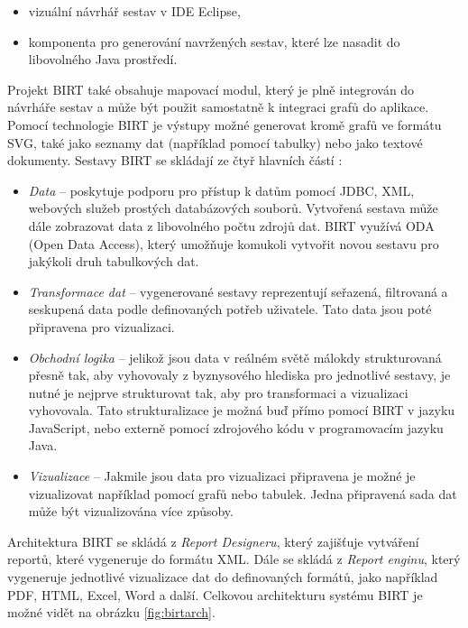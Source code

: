 \documentclass[czech,master,public,dept460,male,cpdeclaration,oneside]{diploma}
\begin{document}
\begin{itemize}
\item vizuální návrhář sestav v IDE Eclipse,
\item komponenta pro generování navržených sestav, které lze nasadit do libovolného Java prostředí.
\end{itemize}

Projekt BIRT také obsahuje mapovací modul, který je plně integrován do návrháře sestav a může být použit samostatně k integraci grafů do aplikace. Pomocí technologie BIRT je výstupy možné generovat kromě grafů ve formátu SVG, také jako seznamy dat (například pomocí tabulky) nebo jako textové dokumenty. Sestavy BIRT se skládají ze čtyř hlavních částí \cite{ref:birt_about}: 

\begin{itemize}
\item \textit{Data} -- poskytuje podporu pro přístup k datům pomocí JDBC, XML, webových služeb prostých databázových souborů. Vytvořená sestava může dále zobrazovat data z libovolného počtu zdrojů dat. BIRT využívá ODA (Open Data Access), který umožňuje komukoli vytvořit novou sestavu pro jakýkoli druh tabulkových dat.
\item \textit{Transformace dat} -- vygenerované sestavy reprezentují seřazená, filtrovaná a seskupená data podle definovaných potřeb uživatele. Tato data jsou poté připravena pro vizualizaci.
\item \textit{Obchodní logika} -- jelikož jsou data v reálném světě málokdy strukturovaná přesně tak, aby vyhovovaly z byznysového hlediska pro jednotlivé sestavy, je nutné je nejprve strukturovat tak, aby pro transformaci a vizualizaci vyhovovala. Tato strukturalizace je možná buď přímo pomocí BIRT v jazyku JavaScript, nebo externě pomocí zdrojového kódu v programovacím jazyku Java.

\item \textit{Vizualizace} -- Jakmile jsou data pro vizualizaci připravena je možné je vizualizovat například pomocí grafů nebo tabulek. Jedna připravená sada dat může být vizualizována více způsoby.
\end{itemize}

Architektura BIRT se skládá z \textit{Report Designeru}, který zajišťuje vytváření reportů, které vygeneruje do formátu XML. Dále se skládá z \textit{Report enginu}, který vygeneruje jednotlivé vizualizace dat do definovaných formátů, jako například PDF, HTML, Excel, Word a další. Celkovou architekturu systému BIRT je možné vidět na obrázku \ref{fig:birtarch}.
\end{document}
